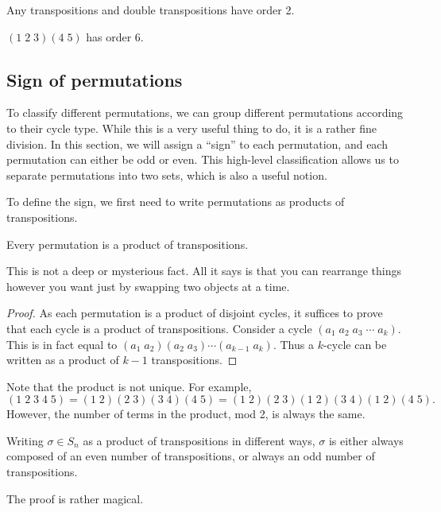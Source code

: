 \documentclass[a4paper]{article}
\begin{document}
\begin{eg}
  Any transpositions and double transpositions have order 2.

  $(1\; 2\; 3)(4\; 5)$ has order 6.
\end{eg}

\subsection{Sign of permutations}
To classify different permutations, we can group different permutations according to their cycle type. While this is a very useful thing to do, it is a rather fine division. In this section, we will assign a ``sign'' to each permutation, and each permutation can either be odd or even. This high-level classification allows us to separate permutations into two sets, which is also a useful notion.

To define the sign, we first need to write permutations as products of transpositions.
\begin{prop}
  Every permutation is a product of transpositions.
\end{prop}
This is not a deep or mysterious fact. All it says is that you can rearrange things however you want just by swapping two objects at a time.

\begin{proof}
  As each permutation is a product of disjoint cycles, it suffices to prove that each cycle is a product of transpositions. Consider a cycle $(a_1\; a_2\; a_3\; \cdots\; a_k)$. This is in fact equal to $(a_1\; a_2)(a_2\; a_3)\cdots (a_{k-1}\; a_k)$. Thus a $k$-cycle can be written as a product of $k - 1$ transpositions.
\end{proof}

Note that the product is not unique. For example,
\[
  (1\; 2\; 3\; 4\; 5) =(1\; 2)(2\; 3)(3\; 4)(4\; 5) = (1\; 2)(2\; 3)(1\; 2)(3\; 4)(1\; 2)(4\; 5).
\]
However, the number of terms in the product, mod 2, is always the same.

\begin{thm}
  Writing $\sigma\in S_n$ as a product of transpositions in different ways, $\sigma$ is either always composed of an even number of transpositions, or always an odd number of transpositions.
\end{thm}
The proof is rather magical.
\end{document}
